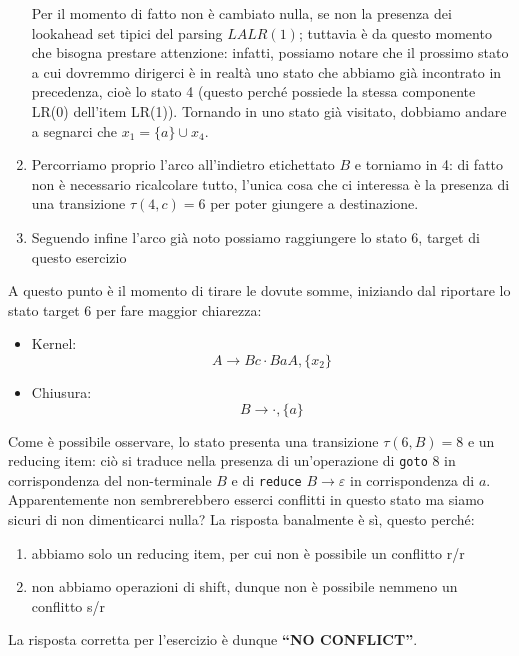 \documentclass[class=book, crop=false, oneside, 12pt]{standalone}
\begin{document}
\begin{enumerate}
    Per il momento di fatto non è cambiato nulla, se non la presenza dei lookahead set tipici del parsing \(LALR(1)\); tuttavia è da questo momento che bisogna prestare attenzione: infatti, possiamo notare che il prossimo stato a cui dovremmo dirigerci è in realtà uno stato che abbiamo già incontrato in precedenza, cioè lo stato 4 (questo perché possiede la stessa componente LR(0) dell'item LR(1)). Tornando in uno stato già visitato, dobbiamo andare a segnarci che \(x_1 = \{a\} \cup x_4\).
    \item Percorriamo proprio l'arco all'indietro etichettato \(B\) e torniamo in 4: di fatto non è necessario ricalcolare tutto, l'unica cosa che ci interessa è la presenza di una transizione \(\tau(4,c) = 6\) per poter giungere a destinazione. 
    \item Seguendo infine l'arco già noto possiamo raggiungere lo stato 6, target di questo esercizio
\end{enumerate}
A questo punto è il momento di tirare le dovute somme, iniziando dal riportare lo stato target 6 per fare maggior chiarezza:
\begin{itemize}
    \item Kernel:
    \begin{equation*}
        A \to Bc \cdot BaA, \{x_2\} 
    \end{equation*}
    \item Chiusura:
    \begin{equation*}
        B \to \cdot, \{a\} 
    \end{equation*}
\end{itemize}

Come è possibile osservare, lo stato presenta una transizione \(\tau(6, B)=8\) e un reducing item: ciò si traduce nella presenza di un'operazione di \texttt{goto} 8 in corrispondenza del non-terminale \(B\) e di \texttt{reduce} \(B \to \varepsilon\) in corrispondenza di \(a\). Apparentemente non sembrerebbero esserci conflitti in questo stato ma siamo sicuri di non dimenticarci nulla? La risposta banalmente è sì, questo perché:

\begin{enumerate}
    \item abbiamo solo un reducing item, per cui non è possibile un conflitto r/r
    \item non abbiamo operazioni di shift, dunque non è possibile nemmeno un conflitto s/r
\end{enumerate}

La risposta corretta per l'esercizio è dunque \textbf{“NO CONFLICT”}.
\end{document}

